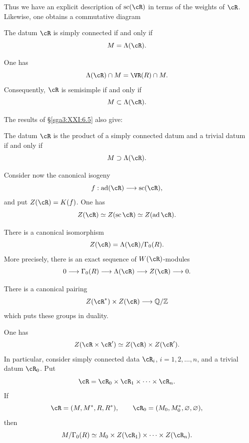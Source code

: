 Thus we have an explicit description of \(\operatorname{sc}(\cR)\)
in terms of the weights of \(\cR\). Likewise, one obtains a
commutative diagram
\begin{center}
\end{center}

\begin{corollary}\label{sga3:XXI:6.6.7}
The datum \(\cR\) is simply connected if and only if
\[
 M=\Lambda(\cR).
\]
\end{corollary}

\begin{remark}\label{sga3:XXI:6.6.8}
One has
\[
 \Lambda(\cR)\cap M=\VR(R)\cap M.
\]
Consequently, \(\cR\) is semisimple if and only if
\[
 M\subset\Lambda(\cR).
\]
\end{remark}

The results of \S\ref{sga3:XXI:6.5} also give:

\begin{corollary}\label{sga3:XXI:6.6.9}
The datum \(\cR\) is the product of a simply connected datum and a
trivial datum if and only if
\[
 M\supset\Lambda(\cR).
\]
\end{corollary}

Consider now the canonical isogeny
\[
 f:\operatorname{ad}(\cR)\longrightarrow\operatorname{sc}(\cR),
\]
and put \(Z(\cR)=K(f)\). One has
\[
 Z(\cR)\simeq Z(\operatorname{sc}\cR)
 \simeq Z(\operatorname{ad}\cR).
\]

\begin{corollary}\label{sga3:XXI:6.6.10}
There is a canonical isomorphism
\[
 Z(\cR)=\Lambda(\cR)/\Gamma_0(R).
\]
More precisely, there is an exact sequence of
\(W(\cR)\)-modules
\[
 0\longrightarrow\Gamma_0(R)\longrightarrow\Lambda(\cR)
 \longrightarrow Z(\cR)\longrightarrow0.
\]
\end{corollary}

\begin{corollary}\label{sga3:XXI:6.6.11}
There is a canonical pairing
\[
 Z(\cR^\ast)\times Z(\cR)\longrightarrow\mathbb Q/\mathbb Z
\]
which puts these groups in duality.
\end{corollary}

\begin{remark}\label{sga3:XXI:6.6.12}
One has
\[
 Z(\cR\times\cR')\simeq Z(\cR)\times Z(\cR').
\]
In particular, consider simply connected data
\(\cR_i\), \(i=1,2,\ldots,n\), and a trivial datum \(\cR_0\).
Put
\[
 \cR=\cR_0\times\cR_1\times\cdots\times\cR_n.
\]
If
\[
 \cR=(M,M^\ast,R,R^\ast),
 \qquad
 \cR_0=(M_0,M_0^\ast,\varnothing,\varnothing),
\]
then
\[
 M/\Gamma_0(R)\simeq
 M_0\times Z(\cR_1)\times\cdots\times Z(\cR_n).
\]
\end{remark}

